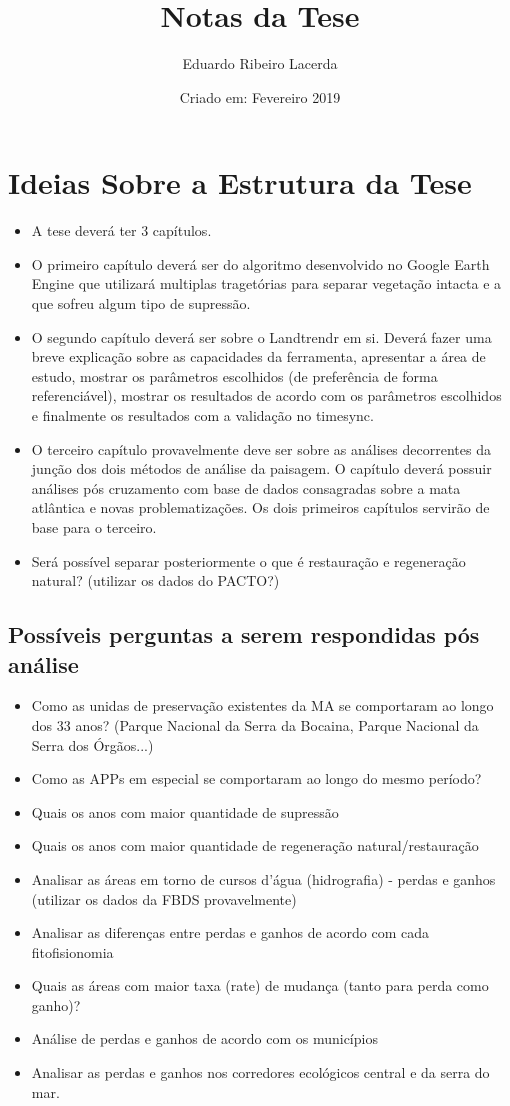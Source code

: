 \documentclass{article}
\title{Notas da Tese}
\author{Eduardo Ribeiro Lacerda }
\date{Criado em: Fevereiro 2019}
\begin{document}
\maketitle

\section{Ideias Sobre a Estrutura da Tese}
\begin{itemize}
    \item A tese deverá ter 3 capítulos.
    \item O primeiro capítulo deverá ser do algoritmo desenvolvido no Google Earth Engine que utilizará multiplas tragetórias para separar vegetação intacta e a que sofreu algum tipo de supressão.
    \item O segundo capítulo deverá ser sobre o Landtrendr em si. Deverá fazer uma breve explicação sobre as capacidades da ferramenta, apresentar a área de estudo, mostrar os parâmetros escolhidos (de preferência de forma referenciável), mostrar os resultados de acordo com os parâmetros escolhidos e finalmente os resultados com a validação no timesync.
    \item O terceiro capítulo provavelmente deve ser sobre as análises decorrentes da junção dos dois métodos de análise da paisagem. O capítulo deverá possuir análises pós cruzamento com base de dados consagradas sobre a mata atlântica e novas problematizações. Os dois primeiros capítulos servirão de base para o terceiro.  
    \item Será possível separar posteriormente o que é restauração e regeneração natural? (utilizar os dados do PACTO?)
\end{itemize}

\subsection{Possíveis perguntas a serem respondidas pós análise}
\begin{itemize}
    \item Como as unidas de preservação existentes da MA se comportaram ao longo dos 33 anos? (Parque Nacional da Serra da Bocaina, Parque Nacional da Serra dos Órgãos...)
    \item Como as APPs em especial se comportaram ao longo do mesmo período?
    \item Quais os anos com maior quantidade de supressão
    \item Quais os anos com maior quantidade de regeneração natural/restauração
    \item Analisar as áreas em torno de cursos d'água (hidrografia) - perdas e ganhos (utilizar os dados da FBDS provavelmente)
    \item Analisar as diferenças entre perdas e ganhos de acordo com cada fitofisionomia
    \item Quais as áreas com maior taxa (rate) de mudança (tanto para perda como ganho)? 
    \item Análise de perdas e ganhos de acordo com os municípios
    \item Analisar as perdas e ganhos nos corredores ecológicos central e da serra do mar. 
\end{itemize}
\end{document}
